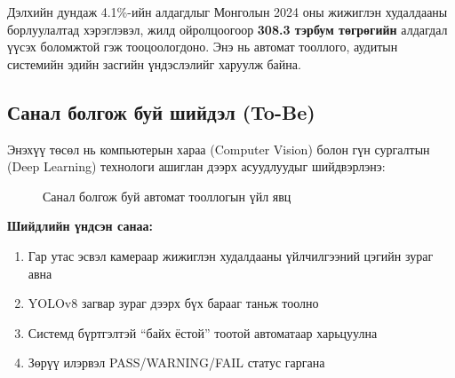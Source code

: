 Дэлхийн дундаж 4.1\%-ийн алдагдлыг Монголын 2024 оны жижиглэн худалдааны борлуулалтад хэрэглэвэл, жилд ойролцоогоор \textbf{308.3 тэрбум төгрөгийн} алдагдал үүсэх боломжтой гэж тооцоологдоно. Энэ нь автомат тооллого, аудитын системийн эдийн засгийн үндэслэлийг харуулж байна.

\subsection{Санал болгож буй шийдэл (To-Be)}

Энэхүү төсөл нь компьютерын хараа (Computer Vision) болон гүн сургалтын (Deep Learning) технологи ашиглан дээрх асуудлуудыг шийдвэрлэнэ:

\begin{figure}[H]
\centering
{}
\caption{Санал болгож буй автомат тооллогын үйл явц}
\label{fig:proposed_process}
\end{figure}

\textbf{Шийдлийн үндсэн санаа:}
\begin{enumerate}
    \item Гар утас эсвэл камераар жижиглэн худалдааны үйлчилгээний цэгийн зураг авна
    \item YOLOv8 загвар зураг дээрх бүх барааг таньж тоолно
    \item Системд бүртгэлтэй ``байх ёстой'' тоотой автоматаар харьцуулна
    \item Зөрүү илэрвэл PASS/WARNING/FAIL статус гаргана
\end{enumerate}

